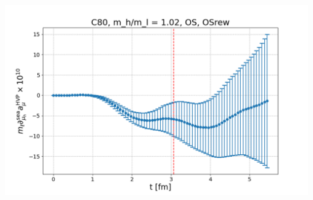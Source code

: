 \documentclass[xcolor={dvipsnames,table}]{beamer}
\begin{document}
\begin{frame}
\begin{columns}
\begin{column}{0.5\textwidth}
     \includegraphics[trim=0cm 0.3cm 0cm 1.2cm, clip,width=\textwidth]{plots/der_mq_sea_lore/amu_C80_OS_der_001ml.png}
    \end{column}
   \end{columns}
\end{frame}
\end{document}
